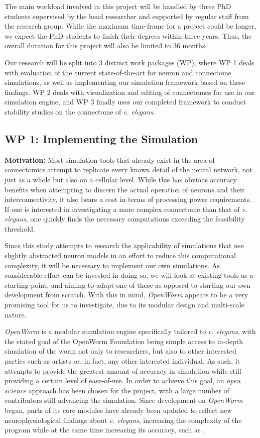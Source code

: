 \documentclass[a4paper,11pt]{article}
\begin{document}
The main workload involved in this project will be handled by three PhD students
supervised by the head researcher and supported by regular staff from the research group.
While the maximum time-frame for a project could be longer, we expect the PhD students to finish their degrees within three years. Thus, the overall duration for this project will also be limited to 36 months.

Our research will be split into 3 distinct work packages (WP), where WP 1 deals with evaluation of the current state-of-the-art for neuron and connectome simulations, as well as implementing our simulation framework based on these findings. WP 2 deals with visualization and editing of connectomes for use in our simulation engine, and WP 3 finally uses our completed framework to conduct stability studies on the connectome of \emph{c. elegans}.


\subsection{WP 1: Implementing the Simulation}

\textbf{Motivation:}
Most simulation tools that already exist in the area of connectomics attempt to replicate every known detail of the neural network, not just as a whole but also on a cellular level. While this has obvious accuracy benefits when attempting to discern the actual operation of neurons and their interconnectivity, it also bears a cost in terms of processing power requirements. If one is interested in investigating a more complex connectome than that of \emph{c. elegans}, one quickly finds the necessary computations exceeding the feasibility threshold.

Since this study attempts to research the applicability of simulations that use slightly abstracted neuron models in an effort to reduce this computational complexity, it will be necessary to implement our own simulations. As considerable effort can be invested in doing so, we will look at existing tools as a starting point, and aiming to adapt one of these as opposed to starting our own development from scratch. With this in mind, \emph{OpenWorm} \citep{Szigeti2014} appears to be a very promising tool for us to investigate, due to its modular design and multi-scale nature.

\emph{OpenWorm} is a modular simulation engine specifically tailored to \emph{c. elegans}, with the stated goal of the OpenWorm Foundation being simple access to in-depth simulation of the worm not only to researchers, but also to other interested parties such as artists or, in fact, any other interested individual. As such, it attempts to provide the greatest amount of accuracy in simulation while still providing a certain level of ease-of-use. In order to achieve this goal, an \emph{open science} \citep{nielsen2012reinventing} approach has been chosen for the project, with a large number of contributors still advancing the simulation. Since development on \emph{OpenWorm} began, parts of its core modules have already been updated to reflect new neurophysiological findings about \emph{c. elegans}, increasing the complexity of the program while at the same time increasing its accuracy, such as \citep{M.2013}.
\end{document}
